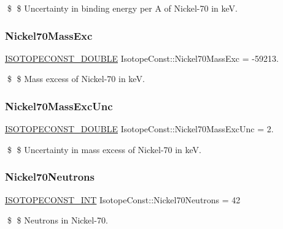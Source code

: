 \$ \$ Uncertainty in binding energy per A of Nickel-\/70 in keV. \mbox{\label{group___isotope_const-_nickel-_ni70_ga5a5ed6764c4f98837bccac672f00ffdb}} 
\subsubsection{\texorpdfstring{Nickel70\+Mass\+Exc}{Nickel70MassExc}}
{\footnotesize\ttfamily \mbox{\hyperlink{group___isotope_const-_macros_ga8f45a7272ce02c0b4c65c44636ed719a}{I\+S\+O\+T\+O\+P\+E\+C\+O\+N\+S\+T\+\_\+\+D\+O\+U\+B\+LE}} Isotope\+Const\+::\+Nickel70\+Mass\+Exc = -\/59213.}

\$ \$ Mass excess of Nickel-\/70 in keV. \mbox{\label{group___isotope_const-_nickel-_ni70_gad13b518799f4a65d88c03742f6df8c62}} 
\subsubsection{\texorpdfstring{Nickel70\+Mass\+Exc\+Unc}{Nickel70MassExcUnc}}
{\footnotesize\ttfamily \mbox{\hyperlink{group___isotope_const-_macros_ga8f45a7272ce02c0b4c65c44636ed719a}{I\+S\+O\+T\+O\+P\+E\+C\+O\+N\+S\+T\+\_\+\+D\+O\+U\+B\+LE}} Isotope\+Const\+::\+Nickel70\+Mass\+Exc\+Unc = 2.}

\$ \$ Uncertainty in mass excess of Nickel-\/70 in keV. \mbox{\label{group___isotope_const-_nickel-_ni70_ga3b05e7ae000a050abe02a0028ba92b3c}} 
\subsubsection{\texorpdfstring{Nickel70\+Neutrons}{Nickel70Neutrons}}
{\footnotesize\ttfamily \mbox{\hyperlink{group___isotope_const-_macros_ga5f18360b3e99483a35c32d789e62621c}{I\+S\+O\+T\+O\+P\+E\+C\+O\+N\+S\+T\+\_\+\+I\+NT}} Isotope\+Const\+::\+Nickel70\+Neutrons = 42}

\$ \$ Neutrons in Nickel-\/70. \mbox{\label{group___isotope_const-_nickel-_ni70_ga5930bb98a7e80379163b256a8f3cf8c3}} 
